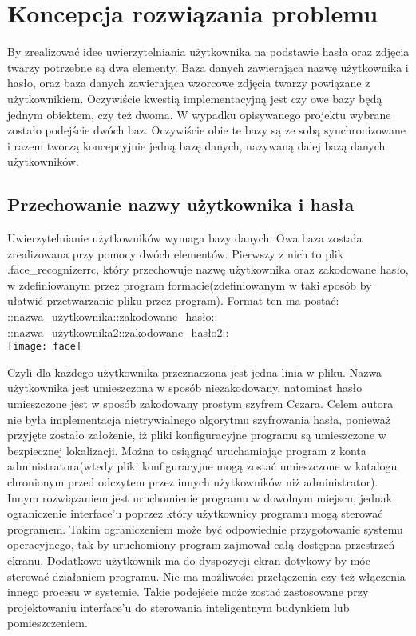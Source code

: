 \documentclass[eng,printmode]{mgr}
\begin{document}
\section{Koncepcja rozwiązania problemu}
By zrealizować idee uwierzytelniania użytkownika na podstawie hasła oraz zdjęcia twarzy potrzebne są dwa elementy. Baza danych zawierająca nazwę użytkownika i hasło, oraz baza danych zawierająca wzorcowe zdjęcia twarzy powiązane z użytkownikiem. Oczywiście kwestią implementacyjną jest czy owe bazy będą jednym obiektem, czy też dwoma. W wypadku opisywanego projektu wybrane zostało podejście dwóch baz. Oczywiście obie te bazy są ze sobą synchronizowane i razem tworzą koncepcyjnie jedną bazę danych, nazywaną dalej bazą danych użytkowników.
\subsection{Przechowanie nazwy użytkownika i hasła}
Uwierzytelnianie użytkowników wymaga bazy danych. Owa baza została zrealizowana przy pomocy dwóch elementów. Pierwszy z nich to plik .face\_recognizerrc, który przechowuje nazwę użytkownika oraz zakodowane hasło, w zdefiniowanym przez program formacie(zdefiniowanym w taki sposób by ułatwić przetwarzanie pliku przez program). Format ten ma postać:\\
::nazwa\_użytkownika::zakodowane\_hasło::\\
::nazwa\_użytkownika2::zakodowane\_hasło2::
\\
\texttt{[image: face]}


Czyli dla każdego użytkownika przeznaczona jest jedna linia w pliku. Nazwa użytkownika jest umieszczona w sposób niezakodowany, natomiast hasło umieszczone jest w sposób zakodowany prostym szyfrem Cezara. Celem autora nie była implementacja nietrywialnego algorytmu szyfrowania hasła, ponieważ przyjęte zostało założenie, iż pliki konfiguracyjne programu są umieszczone w bezpiecznej lokalizacji. Można to osiągnąć uruchamiając program z konta administratora(wtedy pliki konfiguracyjne mogą zostać umieszczone w katalogu chronionym przed odczytem przez innych użytkowników niż administrator).
\\

Innym rozwiązaniem jest uruchomienie programu w dowolnym miejscu, jednak ograniczenie interface'u poprzez który użytkownicy programu mogą sterować programem. Takim ograniczeniem może być odpowiednie przygotowanie systemu operacyjnego, tak by uruchomiony program zajmował całą dostępna przestrzeń ekranu. Dodatkowo użytkownik ma do dyspozycji ekran dotykowy by móc sterować działaniem programu. Nie ma możliwości przełączenia czy też włączenia innego procesu w systemie. Takie podejście może zostać zastosowane przy projektowaniu interface'u do sterowania inteligentnym budynkiem lub pomieszczeniem.
\end{document}
